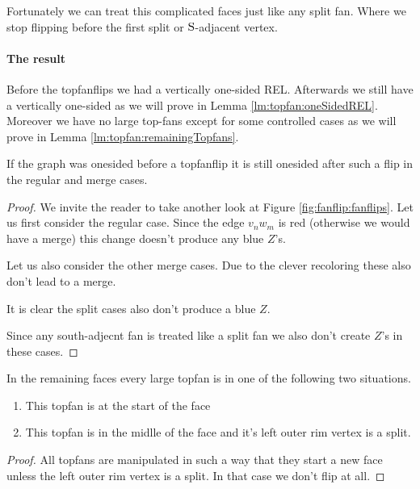 Fortunately we can treat this complicated faces just like any split fan. Where we stop flipping before the first split or $\mathrm{S}$-adjacent vertex.


\paragraph{The result}
Before the topfanflips we had a vertically one-sided REL. Afterwards we still have a vertically one-sided \rel as we will prove in Lemma \ref{lm:topfan:oneSidedREL}. Moreover we have no large top-fans except for some controlled cases as we will prove in Lemma \ref{lm:topfan:remainingTopfans}.

\begin{lemma}
  \label{lm:topfan:oneSidedREL}
  If the graph was onesided before a topfanflip it is still onesided after such a flip in the regular and merge cases.
\end{lemma}
\begin{proof}
  We invite the reader to take another look at Figure \ref{fig:fanflip:fanflips}.
  Let us first consider the regular case. Since the edge  $v_n w_m$ is red (otherwise we would have a merge) this change doesn't produce any blue $Z$'s.

  Let us also consider the other merge cases. Due to the clever recoloring these also don't lead to a merge.

  It is clear the split cases also don't produce a blue $Z$.

  Since any south-adjecnt fan is treated like a split fan we also don't create $Z$'s  in these cases.
\end{proof}


\begin{lemma}
  \label{lm:topfan:remainingTopfans}
  In the remaining faces every large topfan is in one of the following two situations.
  \begin{enumerate}
    \item  This topfan is at the start of the face
    \item  This topfan is in the midlle of the face and it's left outer rim vertex is a split.
  \end{enumerate}
\end{lemma}
\begin{proof}
  All topfans are manipulated in such a way that they start a new face unless the left outer rim vertex is a split. In that case we don't flip at all.
\end{proof}
